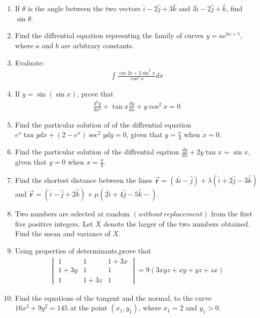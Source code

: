 \documentclass[10pt,-letter paper]{article}
\providecommand{\brak}[1]{\ensuremath{\left(#1\right)}}
\newcommand{\mydet}[1]{\ensuremath{\begin{vmatrix}#1\end{vmatrix}}}
\begin{document}
\begin{enumerate}
\item If $\theta$ is the angle between the two vectors $\hat{i}-2\hat{j}+3\hat{k}$ and $3\hat{i}-2\hat{j}+\hat{k}$, find $\sin\theta$.

\item Find the diffrential equation represnting the family of curves $y=ae^{bx+5}$, where $a$ and $b$ are arbitrary constants.

\item Evaluate:
			\begin{align*}
			\int\frac{\cos 2x+2\sin^{2}x}{\cos^{2}x}dx
				\end{align*}

\item If $y=\sin\brak{\sin x}$, prove that 
		\begin{align*}
			\frac{d^{2}y}{dx^{2}}+\tan x \frac{dy}{dx}+y\cos^{2}x=0
		\end{align*}
	\item Find the particular solution of of the diffrential equation $e^{x}\tan y dx +\brak{2-e^{x}}\sec^{2} y dy=0$, given that $y=\frac{\pi}{4}$ when $x=0$. 
	\item Find the particular solution of the diffrential eqation  $\frac{dy}{dx}+2y\tan x =\sin x$, given that $y=0$ when $x=\frac{\pi}{3}$.

	\item Find the shortest distance between the lines $\overrightarrow{\mathbf{r}}=\brak{4\hat{i}-\hat{j}}+\lambda\brak{\hat{i}+2\hat{j}-3\hat{k}}$ and $\overrightarrow{\mathbf{r}}=\brak{\hat{i}-\hat{j}+2\hat{k}}+\mu\brak{2\hat{i}+4\hat{j}-5\hat{k}-} $.

	\item Two numbers are selected at random \brak{without\hspace{2pt}replacement} from the first five positive integers. Let $X$ denote the larger of the two numbers obtained. Find the mean and variance of $X$.

	\item Using properties of determinants,prove that 
	\begin{align*}
		\mydet{1 & 1 & 1+3x \\ 1+3y & 1 & 1 \\ 1 & 1+3z & 1 }=9\brak{3xyz+xy+yz+zx}
	\end{align*}

\item Find the equations of the tangent and the normal, to the curve $16x^{2}+9y^{2}=145$ at the point $\brak{x_1,y_1}$, where $x_1=2$ and $y_1>0$.


\end{enumerate}
\end{document}
